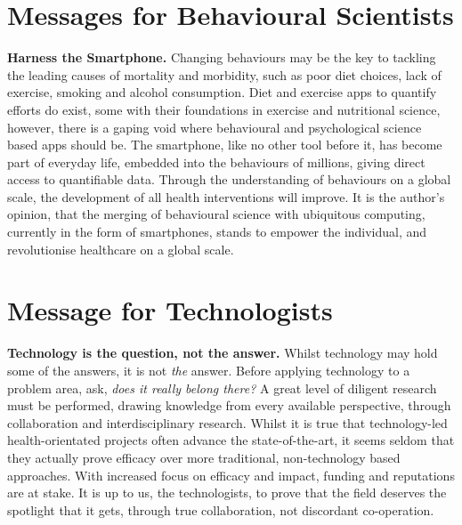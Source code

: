 \section{Messages for Behavioural Scientists}
\textbf{Harness the Smartphone.}
Changing behaviours may be the key to tackling the leading causes of mortality and morbidity, such as poor diet choices, lack of exercise, smoking and alcohol consumption. Diet and exercise apps to quantify efforts do exist, some with their foundations in exercise and nutritional science, however, there is a gaping void where behavioural and psychological science based apps should be. 
The smartphone, like no other tool before it, has become part of everyday life, embedded into the behaviours of millions, giving direct access to quantifiable data. Through the understanding of behaviours on a global scale, the development of all health interventions will improve. It is the author's opinion, that the merging of behavioural science with ubiquitous computing, currently in the form of smartphones, stands to empower the individual, and revolutionise healthcare on a global scale. 

\section{Message for Technologists}
\textbf{Technology is the question, not the answer.}
Whilst technology may hold some of the answers, it is not \textit{the} answer. Before applying technology to a problem area, ask, \textit{does it really belong there?}
A great level of diligent research must be performed, drawing knowledge from every available perspective, through collaboration and interdisciplinary research. Whilst it is true that technology-led health-orientated projects often advance the state-of-the-art, it seems seldom that they actually prove efficacy over more traditional, non-technology based approaches. With increased focus on efficacy and impact, funding and reputations are at stake. It is up to us, the technologists, to prove that the field deserves the spotlight that it gets, through true collaboration, not discordant co-operation.